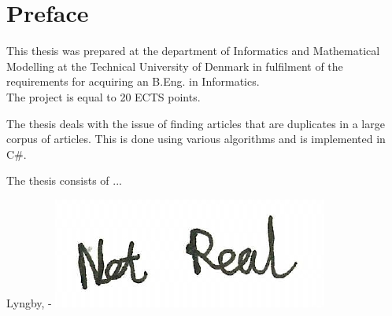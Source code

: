 \chapter{Preface}

This thesis was prepared at the department of Informatics and Mathematical Modelling at the Technical University of Denmark in fulfilment of the
requirements for acquiring an B.Eng. in Informatics. \\
The project is equal to 20 ECTS points.

The thesis deals with the issue of finding articles that are duplicates in a large corpus of articles. This is done using various algorithms and is implemented in C\#.

The thesis consists of ...
\vspace{20mm}
\begin{center}
    \hspace{20mm} Lyngby, \thesishandin-\thesisyear
    \vspace{5mm}
    \newline
    \includegraphics[scale=0.5]{figures/SignatureDummy}
\end{center}
\begin{flushright}
    \thesisauthor
\end{flushright}
